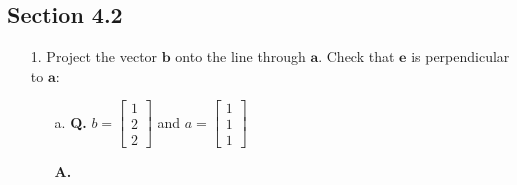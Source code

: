 \documentclass[main.tex]{subfiles}
\begin{document}
\subsection{Section 4.2}
\begin{enumerate}
    \item [1.] Project the vector $\boldsymbol{b}$ onto the line through $\boldsymbol{a}$. Check that $\boldsymbol{e}$ is perpendicular to $\boldsymbol{a}$:
    \begin{enumerate}
        \item [a.] \textbf{Q.} $b=\left[\begin{array}{l}1 \\ 2 \\ 2\end{array}\right]$ and $a=\left[\begin{array}{l}1 \\ 1 \\ 1\end{array}\right]$ 
        
        \textbf{A.}
        

\end{enumerate}
\end{enumerate}
\end{document}
